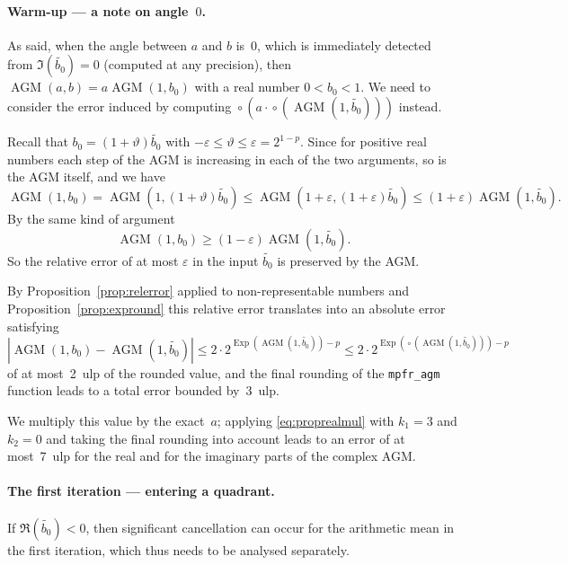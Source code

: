 \documentclass [11pt]{article}
\newcommand {\appro}[1]{\widetilde {#1}}
\newcommand {\ulp}[1]{#1~ulp}
\DeclareMathOperator{\Exp}{\operatorname {Exp}}
\newcommand {\round}{\operatorname {\circ}}
\renewcommand {\epsilon}{\varepsilon}
\renewcommand {\theta}{\vartheta}
\renewcommand {\leq}{\leqslant}
\renewcommand {\geq}{\geqslant}
\newcommand {\AGM}{\operatorname{AGM}}
\begin{document}
\paragraph {Warm-up --- a note on angle~$0$.}

As said, when the angle between $a$ and $b$ is~$0$, which is immediately
detected from $\Im (\appro {b_0}) = 0$ (computed at any precision),
then $\AGM (a, b) = a \AGM (1, b_0)$ with a real number $0 < b_0 < 1$.
We need to consider the error induced by computing
$\round \left( a \cdot \round \left( \AGM (1, \appro {b_0}) \right) \right)$
instead.

Recall that $b_0 = (1 + \theta) \appro {b_0}$ with
$- \epsilon \leq \theta \leq \epsilon = 2^{1-p}$.
Since for positive real numbers each step of the AGM is increasing in
each of the two arguments, so is the AGM itself, and we have
\[
\AGM (1, b_0)
= \AGM \left( 1, (1 + \theta) \appro {b_0} \right)
\leq \AGM \left( 1 + \epsilon, (1 + \epsilon) \appro {b_0} \right)
\leq (1 + \epsilon) \AGM \left( 1, \appro {b_0} \right).
\]
By the same kind of argument
\[
\AGM (1, b_0) \geq (1 - \epsilon) \AGM \left( 1, \appro {b_0} \right).
\]
So the relative error of at most $\epsilon$ in the input $\appro {b_0}$
is preserved by the AGM.

By Proposition~\ref {prop:relerror} applied to non-representable numbers
and Proposition~\ref {prop:expround} this relative error translates into
an absolute error satisfying
\[
\left| \AGM (1, b_0) - \AGM \left( 1, \appro {b_0} \right) \right|
\leq 2 \cdot 2^{\Exp \left( \AGM \left( 1, \appro {b_0} \right) \right)
   - p}
\leq 2 \cdot 2^{\Exp \left( \round \left(
   \AGM \left( 1, \appro {b_0} \right) \right) \right) - p}
\]
of at most~\ulp {2} of the rounded value, and the final rounding of the
\texttt {mpfr\_agm} function leads to a total error bounded by~\ulp {3}.

We multiply this value by the exact~$a$; applying \eqref {eq:proprealmul}
with $k_1 = 3$ and $k_2 = 0$ and taking the final rounding into account
leads to an error of at most~\ulp {7} for the real and for the imaginary
parts of the complex AGM.


\paragraph {The first iteration --- entering a quadrant.}
If $\Re (\appro {b_0}) < 0$, then significant cancellation can occur for the
arithmetic mean in the first iteration, which thus needs to be analysed
separately.
\end{document}
